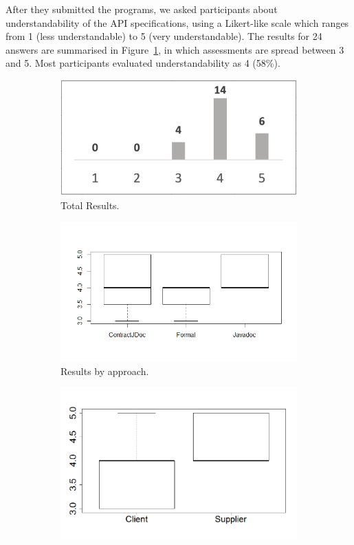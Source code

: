 After they submitted the programs, we asked participants about understandability of the API specifications, using a Likert-like scale which ranges from 1 (less understandable) to 5 (very understandable). The results for 24 answers are summarised in Figure~\ref{fig:ExpAnswersTotal}, in which assessments are spread between 3 and 5. Most participants evaluated understandability as 4 (58\%).

\begin{figure}
\centering
\begin{subfigure}{.32\textwidth}
\includegraphics[width=1\textwidth]{figs/ExpAnswersTotal.png}
\caption{Total Results.}
\label{fig:ExpAnswersTotal}
\end{subfigure}
\begin{subfigure}{.33\textwidth}
\includegraphics[width=1\linewidth]{figs/boxplotApproachesEmpiricalStudy}
\caption{Results by approach.}
\label{fig:approachesEmpirical}
\end{subfigure}
\begin{subfigure}{.33\textwidth}
\includegraphics[width=1\linewidth]{figs/boxplotTasksEmpiricalStudy}

\end{subfigure}
\end{figure}
